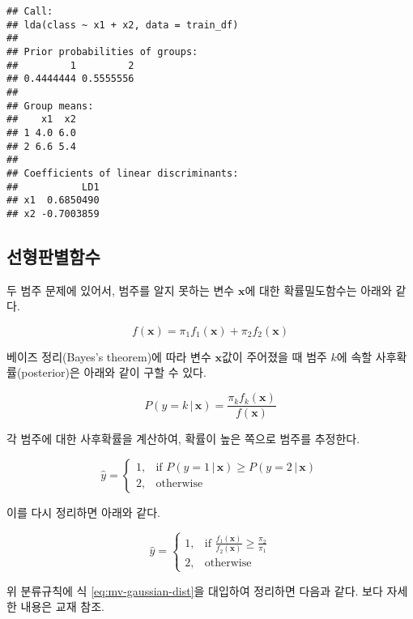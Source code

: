 \documentclass[]{book}
\begin{document}
\begin{verbatim}
## Call:
## lda(class ~ x1 + x2, data = train_df)
## 
## Prior probabilities of groups:
##         1         2 
## 0.4444444 0.5555556 
## 
## Group means:
##    x1  x2
## 1 4.0 6.0
## 2 6.6 5.4
## 
## Coefficients of linear discriminants:
##           LD1
## x1  0.6850490
## x2 -0.7003859
\end{verbatim}

\hypertarget{lda-function}{%
\subsection{선형판별함수}\label{lda-function}}

두 범주 문제에 있어서, 범주를 알지 못하는 변수 \(\mathbf{x}\)에 대한 확률밀도함수는 아래와 같다.

\begin{equation*}
f(\mathbf{x}) = \pi_1 f_1(\mathbf{x}) + \pi_2 f_2(\mathbf{x})
\end{equation*}

베이즈 정리(Bayes's theorem)에 따라 변수 \(\mathbf{x}\)값이 주어졌을 때 범주 \(k\)에 속할 사후확률(posterior)은 아래와 같이 구할 수 있다.

\begin{equation}
P(y = k \, | \, \mathbf{x}) = \frac{\pi_k f_k(\mathbf{x})}{f(\mathbf{x})}
\label{eq:lda-posterior}
\end{equation}

각 범주에 대한 사후확률을 계산하여, 확률이 높은 쪽으로 범주를 추정한다.

\begin{equation}
\hat{y} = \begin{cases}
    1, & \text{if } P(y = 1 \, | \, \mathbf{x}) \ge P(y = 2 \, | \, \mathbf{x})\\
    2, & \text{otherwise}
\end{cases}
\label{eq:lda-posterior-rule}
\end{equation}

이를 다시 정리하면 아래와 같다.

\begin{equation*}
\hat{y} = \begin{cases}
    1, & \text{if } \frac{f_1(\mathbf{x})}{f_2(\mathbf{x})} \ge \frac{\pi_2}{\pi_1}\\
    2, & \text{otherwise}
\end{cases}
\end{equation*}

위 분류규칙에 식 \eqref{eq:mv-gaussian-dist}을 대입하여 정리하면 다음과 같다. 보다 자세한 내용은 교재 \citep{jun2012datamining} 참조.
\end{document}
